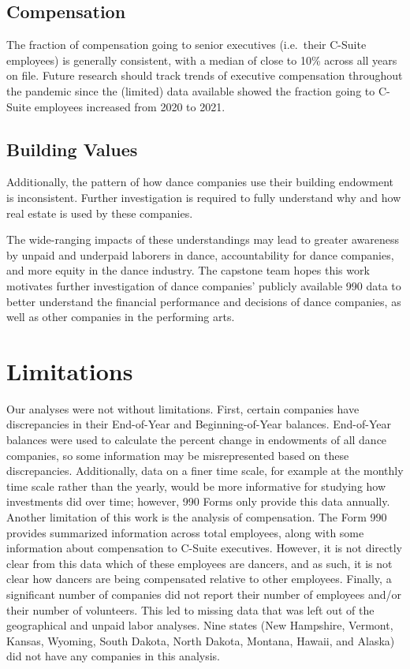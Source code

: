 \documentclass[Dance Data
Project,article,submit,moreauthors,pdftex]{mdpi}
\begin{document}
\hypertarget{compensation}{%
\subsection{Compensation}\label{compensation}}

The fraction of compensation going to senior executives (i.e.~their
C-Suite employees) is generally consistent, with a median of close to
10\% across all years on file. Future research should track trends of
executive compensation throughout the pandemic since the (limited) data
available showed the fraction going to C-Suite employees increased from
2020 to 2021.

\hypertarget{building-values}{%
\subsection{Building Values}\label{building-values}}

Additionally, the pattern of how dance companies use their building
endowment is inconsistent. Further investigation is required to fully
understand why and how real estate is used by these companies.

The wide-ranging impacts of these understandings may lead to greater
awareness by unpaid and underpaid laborers in dance, accountability for
dance companies, and more equity in the dance industry. The capstone
team hopes this work motivates further investigation of dance companies'
publicly available 990 data to better understand the financial
performance and decisions of dance companies, as well as other companies
in the performing arts.

\hypertarget{limitations}{%
\section{Limitations}\label{limitations}}

Our analyses were not without limitations. First, certain companies have
discrepancies in their End-of-Year and Beginning-of-Year balances.
End-of-Year balances were used to calculate the percent change in
endowments of all dance companies, so some information may be
misrepresented based on these discrepancies. Additionally, data on a
finer time scale, for example at the monthly time scale rather than the
yearly, would be more informative for studying how investments did over
time; however, 990 Forms only provide this data annually. Another
limitation of this work is the analysis of compensation. The Form 990
provides summarized information across total employees, along with some
information about compensation to C-Suite executives. However, it is not
directly clear from this data which of these employees are dancers, and
as such, it is not clear how dancers are being compensated relative to
other employees. Finally, a significant number of companies did not
report their number of employees and/or their number of volunteers. This
led to missing data that was left out of the geographical and unpaid
labor analyses. Nine states (New Hampshire, Vermont, Kansas, Wyoming,
South Dakota, North Dakota, Montana, Hawaii, and Alaska) did not have
any companies in this analysis.
\end{document}
